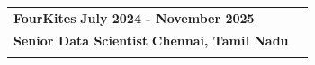 \documentclass[a4paper,11pt]{article}
\begin{document}
\begin{tabularx}{\linewidth}{ @{}l r@{} }
\textbf{\Large{FourKites}} \hfill \textbf{July 2024 - November 2025} \\[4pt]
\textbf{\Large{Senior Data Scientist}} \hfill \textbf{Chennai, Tamil Nadu}\\[4pt]
\begin{minipage}[t]{\linewidth}
    \begin{itemize}[nosep,after=\strut, leftmargin=1em, itemsep=4pt]

\end{itemize}
\end{minipage}
\end{tabularx}
\end{document}
